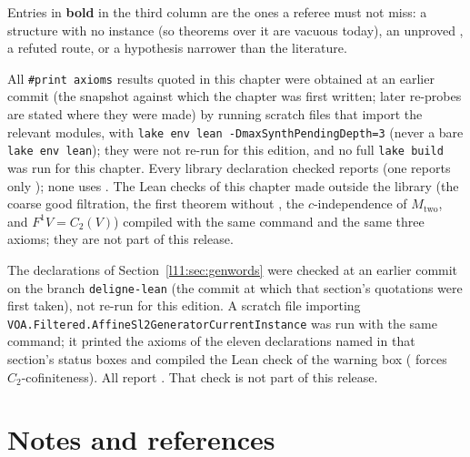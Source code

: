 Entries in \textbf{bold} in the third column are the ones a referee must not miss: a structure with no instance (so theorems
over it are vacuous today), an unproved , a refuted route, or a hypothesis narrower than the literature.

All \texttt{\#print axioms} results quoted in this chapter were obtained at an earlier commit (the snapshot
against which the chapter was first written; later re-probes are stated where they were made) by running scratch files that
import the relevant modules, with \texttt{lake env lean -DmaxSynthPendingDepth=3} (never a bare \texttt{lake env lean}); they were
not re-run for this edition, and no full \texttt{lake build} was run for this chapter. Every library declaration checked reports \lean{[propext, Classical.}\allowbreak{}\allowbreak\lean{sound]} (one reports only ); none uses . The Lean checks of this chapter made outside the library (the coarse good
filtration, the first theorem without , the $c$-independence of $M_{\mathrm{two}}$, and $F^1V = C_2(V)$) compiled with the
same command and the same three axioms; they are not part of this release.

The declarations of Section~\ref{l11:sec:genwords} were checked at an earlier commit on the branch \texttt{deligne-lean}
(the commit at which that section's quotations were first taken), not re-run for this edition. A scratch file
importing \texttt{VOA.\allowbreak Filtered.\allowbreak AffineSl2GeneratorCurrentInstance} was run with the same command; it
printed the axioms of the eleven declarations named in that section's status boxes and compiled the Lean
check of the warning box ( forces $C_2$-cofiniteness). All report \lean{[propext, Classical.}\allowbreak{}\allowbreak\lean{sound]}. That check is not part of this release.

\section{Notes and references}\label{l11:sec:notes}

